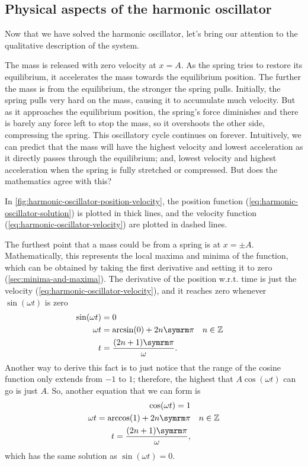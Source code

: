 \subsection{Physical aspects of the harmonic oscillator}

Now that we have solved the harmonic oscillator, let's bring our attention to the qualitative description of the system.

The mass is released with zero velocity at $x = A$. As the spring tries to restore its equilibrium, it accelerates the mass towards the equilibrium position. The further the mass is from the equilibrium, the stronger the spring pulls. Initially, the spring pulls very hard on the mass, causing it to accumulate much velocity. But as it approaches the equilibrium position, the spring's force diminishes and there is barely any force left to stop the mass, so it overshoots the other side, compressing the spring. This oscillatory cycle continues on forever. Intuitively, we can predict that the mass will have the highest velocity and lowest acceleration as it directly passes through the equilibrium; and, lowest velocity and highest acceleration when the spring is fully stretched or compressed. But does the mathematics agree with this?

In \cref{fig:harmonic-oscillator-position-velocity}, the position function (\cref{eq:harmonic-oscillator-solution}) is plotted in thick lines, and the velocity function (\cref{eq:harmonic-oscillator-velocity}) are plotted in dashed lines.

The furthest point that a mass could be from a spring is at $x = \pm A$. Mathematically, this represents the local maxima and minima of the function, which can be obtained by taking the first derivative and setting it to zero (\cref{sec:minima-and-maxima}). The derivative of the position w.r.t. time is just the velocity (\cref{eq:harmonic-oscillator-velocity}), and it reaches zero whenever $\sin(\omega t)$ is zero
\begin{align}
	\sin(\omega t) &= 0 \\
	\omega t &= \arcsin(0) + 2n\cpi && n \in \mathbb{Z}\\
	t &= \frac{(2n + 1)\cpi}{\omega}. \label{eq:harmonic-oscillator-max-position}
\end{align}
Another way to derive this fact is to just notice that the range of the cosine function only extends from $-1$ to $1$; therefore, the highest that $A\cos(\omega t)$ can go is just $A$. So, another equation that we can form is
\begin{align}
	\cos(\omega t) = 1 \\
	\omega t = \arccos(1) + 2n\cpi && n \in \mathbb{Z} \\
	t = \frac{(2n + 1)\cpi}{\omega},
\end{align}
which has the same solution as $\sin(\omega t) = 0$.


